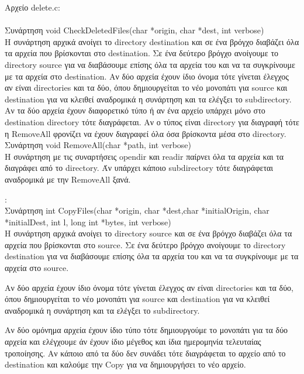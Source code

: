 \documentclass[10pt,a4]{article}
\newcommand{\la}{\latintext}
\begin{document}
\begin{itemize}
	{\sf Αρχείο {\la delete.c:}}\\ \\
	Συνάρτηση {\la void CheckDeletedFiles(char *origin, char *dest, int verbose)}\\
	Η συνάρτηση αρχικά ανοίγει το {\la directory destination} και σε ένα βρόγχο διαβάζει όλα τα αρχεία που βρίσκονται
	στο {\la destination}. Σε ένα δεύτερο βρόγχο ανοίγουμε το {\la directory source} για να διαβάσουμε επίσης όλα τα
	αρχεία του και να τα συγκρίνουμε με τα αρχεία στο {\la destination}. Αν δύο αρχεία έχουν ίδιο όνομα τότε γίνεται έλεγχος
	αν είναι {\la directories} και τα δύο, όπου δημιουργείται το νέο μονοπάτι για {\la source} και {\la destination} για να 
	κλειθεί αναδρομικά η συνάρτηση και τα ελέγξει το {\la subdirectory}. Αν τα δύο αρχεία έχουν διαφορετικό τύπο ή αν ένα
	αρχείο υπάρχει μόνο στο {\la destination directory} τότε διαγράφεται. Αν ο τύπος είναι {\la directory} για διαγραφή τότε
	η {\la RemoveAll} φρονίζει να έχουν διαγραφεί όλα όσα βρίσκοντα μέσα στο {\la directory}.\\
	
	Συνάρτηση  {\la void RemoveAll(char *path, int verbose)}\\
	Η συνάρτηση με τις συναρτήσεις {\la opendir} και {\la readir}  παίρνει όλα τα αρχεία και τα διαγράφει από το {\la directory}.
	Άν υπάρχει κάποιο {\la subdirectory} τότε διαγράφεται αναδρομικά με την {\la RemoveAll} ξανά.
	
	{\sfΑρχείο {\la copy.c}:}\\
	Συνάρτηση {\la int CopyFiles(char *origin, char *dest,char *initialOrigin, char *initialDest, int l, long int *bytes, int verbose)}\\
	Η συνάρτηση αρχικά ανοίγει το {\la directory source} και σε ένα βρόγχο διαβάζει όλα τα αρχεία που βρίσκονται
	στο {\la source}. Σε ένα δεύτερο βρόγχο ανοίγουμε το {\la directory destination} για να διαβάσουμε επίσης όλα τα
	αρχεία του και να τα συγκρίνουμε με τα αρχεία στο {\la source}.\
	
	Αν δύο αρχεία έχουν ίδιο όνομα τότε γίνεται έλεγχος αν είναι {\la directories} και τα δύο, όπου δημιουργείται 
	το νέο μονοπάτι για {\la source} και {\la destination} για να κλειθεί αναδρομικά η συνάρτηση και τα ελέγξει το 
	{\la subdirectory}.\
	
	 Αν δύο ομόνημα αρχεία  έχουν ίδιο τύπο τότε δημιουργούμε το μονοπάτι για τα δύο αρχεία και ελέγχουμε άν έχουν ίδιο
	 μέγεθος και ίδια ημερομηνία τελευταίας τροποίησης. Αν κάποιο από τα δύο δεν συνάδει τότε διαγράφεται το αρχείο
	 από το {\la destination} και καλούμε την {\la Copy} για να δημιουργήσει το νέο αρχείο.\
	 

\end{itemize}
\end{document}
